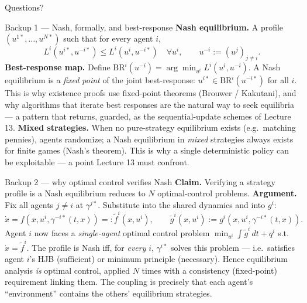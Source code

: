 \documentclass[10pt, aspectratio=169]{beamer}
\begin{document}
\begin{frame}[standout]
Questions?
\end{frame}

\appendix

\begin{frame}{Backup 1 --- Nash, formally, and best-response}
\footnotesize
\textbf{Nash equilibrium.} A profile $(u^{1*},\dots,u^{N*})$ such that for every agent $i$,
\[
L^i(u^{i*}, u^{-i*}) \le L^i(u^{i}, u^{-i*}) \quad \forall u^i, \qquad u^{-i} := (u^j)_{j\ne i}.
\]
\textbf{Best-response map.} Define $\mathrm{BR}^i(u^{-i}) = \arg\min_{u^i} L^i(u^i, u^{-i})$. A Nash equilibrium is a \emph{fixed point} of the joint best-response: $u^{i*} \in \mathrm{BR}^i(u^{-i*})$ for all $i$. This is why existence proofs use fixed-point theorems (Brouwer / Kakutani), and why algorithms that iterate best responses are the natural way to seek equilibria --- a pattern that returns, guarded, as the sequential-update schemes of Lecture 13.
\medskip
\textbf{Mixed strategies.} When no pure-strategy equilibrium exists (e.g.\ matching pennies), agents randomize; a Nash equilibrium in \emph{mixed} strategies always exists for finite games (Nash's theorem). This is why a single deterministic policy can be exploitable --- a point Lecture 13 must confront.
\end{frame}

\begin{frame}{Backup 2 --- why optimal control verifies Nash}
\footnotesize
\textbf{Claim.} Verifying a strategy profile is a Nash equilibrium reduces to $N$ optimal-control problems.
\medskip
\textbf{Argument.} Fix all agents $j\ne i$ at $\gamma^{j*}$. Substitute into the shared dynamics and into $g^i$:
\[
\dot x = f(x, u^i, \gamma^{-i*}(t,x)) =: \tilde f^i(x, u^i), \qquad \tilde g^i(x, u^i) := g^i(x, u^i, \gamma^{-i*}(t,x)).
\]
Agent $i$ now faces a \emph{single-agent} optimal control problem $\min_{u^i}\int \tilde g^i\,dt + q^i$ s.t.\ $\dot x = \tilde f^i$. The profile is Nash iff, for \emph{every} $i$, $\gamma^{i*}$ solves this problem --- i.e.\ satisfies agent $i$'s HJB (sufficient) or minimum principle (necessary). Hence equilibrium analysis \emph{is} optimal control, applied $N$ times with a consistency (fixed-point) requirement linking them. The coupling is precisely that each agent's ``environment'' contains the others' equilibrium strategies.
\end{frame}
\end{document}
